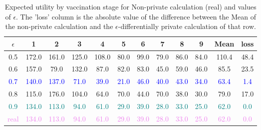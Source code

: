 \documentclass{article}
\begin{document}
\begin{itemize}
\begin{center}
    \begin{table}[H]
    \centering
    \begin{adjustbox}{max width=\textwidth}
        \begin{tabular}{ |c| c c c c c c c c c | c | c |}
        \hline
          $\epsilon$ & \textbf{1} & \textbf{2} & \textbf{3} & \textbf{4}  & \textbf{5} & \textbf{6} & \textbf{7} & \textbf{8} & \textbf{9} & \textbf{Mean} & \textbf{loss} \\
         \hline
         0.5 & 172.0 &  161.0 &  125.0 &  108.0 &  80.0 &  99.0 &  79.0 &  86.0 &  84.0 &  110.4 & 48.4\\ 
         \hline
         0.6 & 157.0 &   79.0 &  132.0 &   87.0 &  82.0 &  83.0 &  45.0 &  59.0 &  46.0 &   85.5 & 23.5\\
         \hline
         \textcolor{blue}{0.7} & \textcolor{blue}{140.0} &  \textcolor{blue}{137.0} &   \textcolor{blue}{71.0} &   \textcolor{blue}{39.0} &  \textcolor{blue}{21.0} &  \textcolor{blue}{46.0} &  \textcolor{blue}{40.0} &  \textcolor{blue}{43.0} &  \textcolor{blue}{34.0} &   \textcolor{blue}{63.4} & \textcolor{blue}{1.4}\\
         \hline
         0.8 & 115.0 &  176.0 &  104.0 &   64.0 &  70.0 &  44.0 &  70.0 &  38.0 &  30.0 &   79.0 & 17.0\\
         \hline
         \textcolor{teal}{0.9} & \textcolor{teal}{134.0} &  \textcolor{teal}{113.0} &   \textcolor{teal}{94.0} &   \textcolor{teal}{61.0} &  \textcolor{teal}{29.0} &  \textcolor{teal}{39.0} &  \textcolor{teal}{28.0} &  \textcolor{teal}{33.0} &  \textcolor{teal}{25.0} &   \textcolor{teal}{62.0} & \textcolor{teal}{0.0}\\
         \hline
         \textcolor{violet}{real} & \textcolor{violet}{134.0} & \textcolor{violet}{113.0} & \textcolor{violet}{94.0} & \textcolor{violet}{61.0} & \textcolor{violet}{29.0} & \textcolor{violet}{39.0} & \textcolor{violet}{28.0} & \textcolor{violet}{33.0} & \textcolor{violet}{25.0} & \textcolor{violet}{62.0} & \textcolor{violet}{0.0}\\
         \hline
        \end{tabular}
    \end{adjustbox}
    \label{tab:utility-differences}
    \caption{Expected utility by vaccination stage for Non-private calculation (real) and values of $\epsilon$. The 'loss' column is the absolute value of the difference between the Mean of the non-private calculation and the $\epsilon$-differentially private calculation of that row.}
    \end{table}
\end{center}


\end{itemize}
\end{document}
